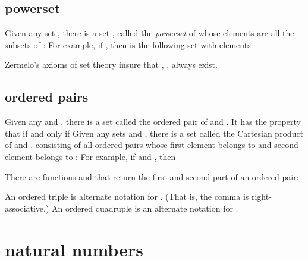 \subsection{powerset}

Given any set , there is a set , called the {\it powerset} of  whose elements are  all the subsets of :
For example, if , then  is the following set with
 elements:


Zermelo's axioms of set theory insure that , ,  always exist.

\subsection{ordered pairs}

Given any  and , there is a set  called the ordered pair
of  and .  It has the property that  if and only if
Given any sets  and , there is a set  called the Cartesian product of  and , consisting of all ordered pairs whose first element belongs to  and second element belongs to :
For example, if  and , then

There are functions  and  that return the first and second part of an ordered pair:

An ordered triple  is alternate notation for .  (That is, the comma is right-associative.)  An ordered quadruple  is an alternate notation for .  









\section{natural numbers}


